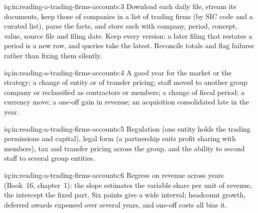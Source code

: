 \begin{solution}{iq:in:reading-a-trading-firms-accounts:3}
Download each daily file, stream its documents, keep those of companies in a list of trading firms (by SIC code and a
curated list), parse the facts, and store each with company, period, concept, value, source file and filing date.
Keep every version: a later filing that restates a period is a new row, and queries take the latest. Reconcile totals
and flag failures rather than fixing them silently.
\end{solution}

\begin{solution}{iq:in:reading-a-trading-firms-accounts:4}
A good year for the market or the strategy; a change of entity or of transfer pricing; staff moved to another group
company or reclassified as contractors or members; a change of fiscal period; a currency move; a one-off gain in
revenue; an acquisition consolidated late in the year.
\end{solution}

\begin{solution}{iq:in:reading-a-trading-firms-accounts:5}
Regulation (one entity holds the trading permissions and capital), legal form (a partnership suits profit sharing
with members), tax and transfer pricing across the group, and the ability to second staff to several group entities.
\end{solution}

\begin{solution}{iq:in:reading-a-trading-firms-accounts:6}
Regress  on revenue across years (Book~16, chapter~1): the slope estimates the variable share per unit of
revenue, the intercept the fixed part. Six points give a wide interval; headcount growth, deferred awards expensed over
several years, and one-off costs all bias it.
\end{solution}
